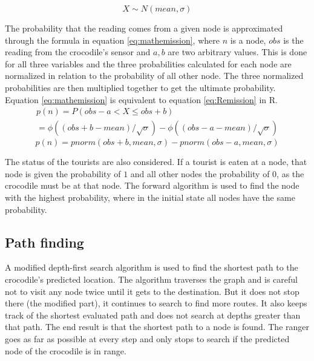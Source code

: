 \documentclass[12pt, a4paper]{article}
\begin{document}
\begin{equation}\label{eq:distribution}
X \sim N(mean,\sigma)
\end{equation}

The probability that the reading comes from a given node is approximated through the formula in equation \ref{eq:mathemission}, where $n$ is a node, $obs$ is the reading from the crocodile's sensor and $a,b$ are two arbitrary values. This is done for all three variables and the three probabilities calculated for each node are normalized in relation to the probability of all other node. The three normalized probabilities are then multiplied together to get the ultimate probability. Equation \ref{eq:mathemission} is equivalent to equation \ref{eq:Remission} in R.
\begin{equation}\label{eq:mathemission}
\begin{split}
p(n) = P(obs-a < X \le obs+b) \hspace{137pt}
\\
=\phi((obs+b-mean)/\sqrt{\sigma})-\phi((obs-a-mean)/\sqrt{\sigma})
\end{split}
\end{equation}
\begin{equation}\label{eq:Remission}
p(n) = pnorm(obs+b,mean,\sigma)-pnorm(obs-a,mean,\sigma)
\end{equation}

The status of the tourists are also considered. If a tourist is eaten at a node, that node is given the probability of $1$ and all other nodes the probability of $0$, as the crocodile must be at that node. The forward algorithm is used to find the node with the highest probability, where in the initial state all nodes have the same probability.

\subsection{Path finding}
A modified depth-first search algorithm\cite{dfsearch} is used to find the shortest path to the crocodile's predicted location. The algorithm traverses the graph and is careful not to visit any node twice until it gets to the destination. But it does not stop there (the modified part), it continues to search to find more routes. It also keeps track of the shortest evaluated path and does not search at depths greater than that path. The end result is that the shortest path to a node is found. The ranger goes as far as possible at every step and only stops to search if the predicted node of the crocodile is in range.
\end{document}
